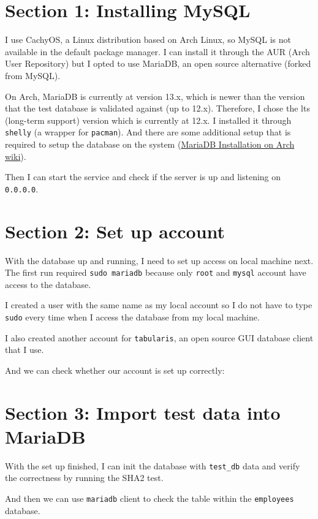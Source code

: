\documentclass{assignment}
\begin{document}

\section*{Section 1: Installing MySQL}
I use CachyOS, a Linux distribution based on Arch Linux, so MySQL is
not available in the default package manager. I can install it
through the AUR (Arch User Repository) but I opted to use MariaDB, an
open source alternative (forked from MySQL).

On Arch, MariaDB is currently at version 13.x, which is newer than
the version that the test database is validated against (up to 12.x).
Therefore, I chose the lts (long-term support) version which is
currently at 12.x. I installed it
through \texttt{shelly} (a wrapper for \texttt{pacman}). And there
are some additional setup that is required to setup the database on
the system
(\href{https://wiki.archlinux.org/title/MariaDB\#Installation}{MariaDB
Installation on Arch wiki}).



Then I can start the service and check if the server is up and
listening on \texttt{0.0.0.0}.



\section*{Section 2: Set up account}
With the database up and running, I need to set up access on local
machine next. The first run required \texttt{sudo mariadb} because
only \texttt{root} and \texttt{mysql} account have access to the database.

I created a user with the same name as my local account so I
do not have to type \texttt{sudo} every time when I access the
database from my local machine.



I also created another account for \texttt{tabularis}, an open source
GUI database client that I use.



And we can check whether our account is set up correctly:



\section*{Section 3: Import test data into MariaDB}
With the set up finished, I can init the database with
\texttt{test\_db} data and verify the correctness by running the SHA2 test.



And then we can use \texttt{mariadb} client to check the table within
the \texttt{employees} database.


\end{document}
